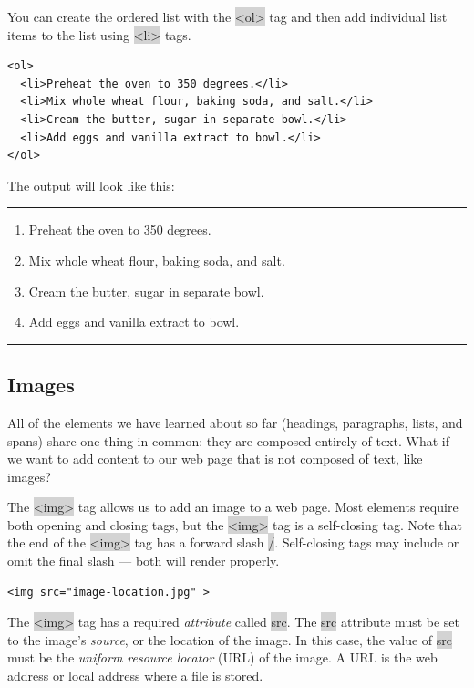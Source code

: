 \documentclass[11pt]{article}
\begin{document}
You can create the ordered list with the \colorbox{lightgray}{<ol>} tag and then add individual list items to the list using \colorbox{lightgray}{<li>} tags.
\begin{lstlisting}
<ol>
  <li>Preheat the oven to 350 degrees.</li>
  <li>Mix whole wheat flour, baking soda, and salt.</li>
  <li>Cream the butter, sugar in separate bowl.</li>
  <li>Add eggs and vanilla extract to bowl.</li>
</ol>
\end{lstlisting}
The output will look like this:
\vspace{-3mm}
\par\noindent\rule{\textwidth}{0.2pt}
\begin{enumerate}[leftmargin = 24pt]
\item Preheat the oven to 350 degrees.
\item Mix whole wheat flour, baking soda, and salt.
\item Cream the butter, sugar in separate bowl.
\item Add eggs and vanilla extract to bowl.
\end{enumerate}
\vspace{-3mm}
\par\noindent\rule{\textwidth}{0.2pt}

\subsection{Images}
All of the elements we have learned about so far (headings, paragraphs, lists, and spans) share one thing in common: they are composed entirely of text. What if we want to add content to our web page that is not composed of text, like images?

The \colorbox{lightgray}{<img>} tag allows us to add an image to a web page. Most elements require both opening and closing tags, but the \colorbox{lightgray}{<img>} tag is a self-closing tag. Note that the end of the \colorbox{lightgray}{<img>} tag has a forward slash \colorbox{lightgray}{/}. Self-closing tags may include or omit the final slash — both will render properly.
\begin{lstlisting}
<img src="image-location.jpg" >
\end{lstlisting}
The \colorbox{lightgray}{<img>} tag has a required \textit{attribute} called \colorbox{lightgray}{src}. The \colorbox{lightgray}{src} attribute must be set to the image’s \textit{source}, or the location of the image. In this case, the value of \colorbox{lightgray}{src} must be the \textit{uniform resource locator} (URL) of the image. A URL is the web address or local address where a file is stored.
\end{document}
